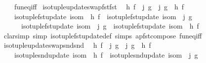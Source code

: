\begin{isabellebody}
\ \ \ \ fun{\isacharunderscore}{\kern0pt}eq{\isacharunderscore}{\kern0pt}iff{\isacharparenright}{\kern0pt}%
\endisatagproof
{\isafoldproof}%
%
\isadelimproof
\isanewline
%
\endisadelimproof
\isanewline
{}\isamarkupfalse%
\ iso{\isacharunderscore}{\kern0pt}tuple{\isacharunderscore}{\kern0pt}update{\isacharunderscore}{\kern0pt}swap{\isacharunderscore}{\kern0pt}fst{\isacharunderscore}{\kern0pt}fst{\isacharcolon}{\kern0pt}\isanewline
\ \ {\isachardoublequoteopen}h\ f\ {\isasymcirc}\ j\ g\ {\isacharequal}{\kern0pt}\ j\ g\ {\isasymcirc}\ h\ f\ {\isasymLongrightarrow}\isanewline
\ \ \ \ {\isacharparenleft}{\kern0pt}iso{\isacharunderscore}{\kern0pt}tuple{\isacharunderscore}{\kern0pt}fst{\isacharunderscore}{\kern0pt}update\ isom\ {\isasymcirc}\ h{\isacharparenright}{\kern0pt}\ f\ {\isasymcirc}\ {\isacharparenleft}{\kern0pt}iso{\isacharunderscore}{\kern0pt}tuple{\isacharunderscore}{\kern0pt}fst{\isacharunderscore}{\kern0pt}update\ isom\ {\isasymcirc}\ j{\isacharparenright}{\kern0pt}\ g\ {\isacharequal}{\kern0pt}\isanewline
\ \ \ \ \ \ {\isacharparenleft}{\kern0pt}iso{\isacharunderscore}{\kern0pt}tuple{\isacharunderscore}{\kern0pt}fst{\isacharunderscore}{\kern0pt}update\ isom\ {\isasymcirc}\ j{\isacharparenright}{\kern0pt}\ g\ {\isasymcirc}\ {\isacharparenleft}{\kern0pt}iso{\isacharunderscore}{\kern0pt}tuple{\isacharunderscore}{\kern0pt}fst{\isacharunderscore}{\kern0pt}update\ isom\ {\isasymcirc}\ h{\isacharparenright}{\kern0pt}\ f{\isachardoublequoteclose}\isanewline
%
\isadelimproof
\ \ %
\endisadelimproof
%
\isatagproof
{}\isamarkupfalse%
\ {\isacharparenleft}{\kern0pt}clarsimp\ simp{\isacharcolon}{\kern0pt}\ iso{\isacharunderscore}{\kern0pt}tuple{\isacharunderscore}{\kern0pt}fst{\isacharunderscore}{\kern0pt}update{\isacharunderscore}{\kern0pt}def\ simps\ apfst{\isacharunderscore}{\kern0pt}compose\ fun{\isacharunderscore}{\kern0pt}eq{\isacharunderscore}{\kern0pt}iff{\isacharparenright}{\kern0pt}%
\endisatagproof
{\isafoldproof}%
%
\isadelimproof
\isanewline
%
\endisadelimproof
\isanewline
{}\isamarkupfalse%
\ iso{\isacharunderscore}{\kern0pt}tuple{\isacharunderscore}{\kern0pt}update{\isacharunderscore}{\kern0pt}swap{\isacharunderscore}{\kern0pt}snd{\isacharunderscore}{\kern0pt}snd{\isacharcolon}{\kern0pt}\isanewline
\ \ {\isachardoublequoteopen}h\ f\ {\isasymcirc}\ j\ g\ {\isacharequal}{\kern0pt}\ j\ g\ {\isasymcirc}\ h\ f\ {\isasymLongrightarrow}\isanewline
\ \ \ \ {\isacharparenleft}{\kern0pt}iso{\isacharunderscore}{\kern0pt}tuple{\isacharunderscore}{\kern0pt}snd{\isacharunderscore}{\kern0pt}update\ isom\ {\isasymcirc}\ h{\isacharparenright}{\kern0pt}\ f\ {\isasymcirc}\ {\isacharparenleft}{\kern0pt}iso{\isacharunderscore}{\kern0pt}tuple{\isacharunderscore}{\kern0pt}snd{\isacharunderscore}{\kern0pt}update\ isom\ {\isasymcirc}\ j{\isacharparenright}{\kern0pt}\ g\ {\isacharequal}{\kern0pt}\isanewline

\end{isabellebody}
